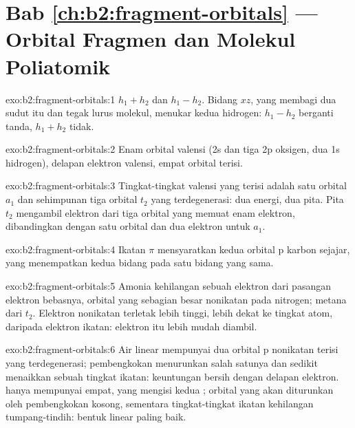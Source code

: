 \section*{Bab \ref{ch:b2:fragment-orbitals} --- Orbital Fragmen dan Molekul Poliatomik}

\begin{solution}{exo:b2:fragment-orbitals:1}
$h_1 + h_2$ dan $h_1 - h_2$. Bidang $xz$, yang membagi dua sudut itu dan
tegak lurus molekul, menukar kedua hidrogen: $h_1 - h_2$ berganti tanda,
$h_1 + h_2$ tidak.
\end{solution}

\begin{solution}{exo:b2:fragment-orbitals:2}
Enam orbital valensi (2s dan tiga 2p oksigen, dua 1s hidrogen), delapan
elektron valensi, empat orbital terisi.
\end{solution}

\begin{solution}{exo:b2:fragment-orbitals:3}
Tingkat-tingkat valensi yang terisi adalah satu orbital $a_1$ dan sehimpunan
tiga orbital $t_2$ yang terdegenerasi: dua energi, dua pita. Pita $t_2$
mengambil elektron dari tiga orbital yang memuat enam elektron,
dibandingkan dengan satu orbital dan dua elektron untuk $a_1$.
\end{solution}

\begin{solution}{exo:b2:fragment-orbitals:4}
Ikatan $\pi$ mensyaratkan kedua orbital p karbon sejajar, yang menempatkan
kedua bidang  pada satu bidang yang sama.
\end{solution}

\begin{solution}{exo:b2:fragment-orbitals:5}
Amonia kehilangan sebuah elektron dari pasangan elektron bebasnya, orbital
yang sebagian besar nonikatan pada nitrogen; metana dari 
$t_2$. Elektron nonikatan terletak lebih tinggi, lebih dekat ke tingkat
atom, daripada elektron ikatan: elektron itu lebih mudah diambil.
\end{solution}

\begin{solution}{exo:b2:fragment-orbitals:6}
Air linear mempunyai dua orbital p nonikatan terisi yang terdegenerasi;
pembengkokan menurunkan salah satunya dan sedikit menaikkan sebuah tingkat
ikatan: keuntungan bersih dengan delapan elektron.  hanya
mempunyai empat, yang mengisi kedua ; orbital yang akan
diturunkan oleh pembengkokan kosong, sementara tingkat-tingkat ikatan
kehilangan tumpang-tindih: bentuk linear paling baik.
\end{solution}

